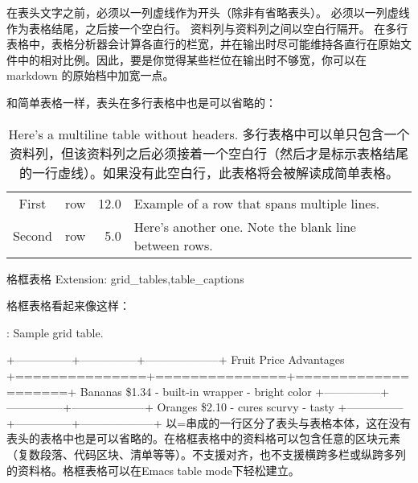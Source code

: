 \documentclass[fancyhdr,bookmark]{ctexbook}
\begin{document}
在表头文字之前，必须以一列虚线作为开头（除非有省略表头）。
必须以一列虚线作为表格结尾，之后接一个空白行。
资料列与资料列之间以空白行隔开。
在多行表格中，表格分析器会计算各直行的栏宽，并在输出时尽可能维持各直行在原始文件中的相对比例。因此，要是你觉得某些栏位在输出时不够宽，你可以在markdown
的原始档中加宽一点。

和简单表格一样，表头在多行表格中也是可以省略的：

\begin{longtable}[c]{@{}clrl@{}}
\caption{Here's a multiline table without headers.
多行表格中可以单只包含一个资料列，但该资料列之后必须接着一个空白行（然后才是标示表格结尾的一行虚线）。如果没有此空白行，此表格将会被解读成简单表格。}\tabularnewline
\toprule
\endfirsthead
\toprule
\begin{minipage}[t]{0.15\columnwidth}\centering\strut
First
\strut\end{minipage} &
\begin{minipage}[t]{0.10\columnwidth}\raggedright\strut
row
\strut\end{minipage} &
\begin{minipage}[t]{0.20\columnwidth}\raggedleft\strut
12.0
\strut\end{minipage} &
\begin{minipage}[t]{0.31\columnwidth}\raggedright\strut
Example of a row that spans multiple lines.
\strut\end{minipage}\tabularnewline
\begin{minipage}[t]{0.15\columnwidth}\centering\strut
Second
\strut\end{minipage} &
\begin{minipage}[t]{0.10\columnwidth}\raggedright\strut
row
\strut\end{minipage} &
\begin{minipage}[t]{0.20\columnwidth}\raggedleft\strut
5.0
\strut\end{minipage} &
\begin{minipage}[t]{0.31\columnwidth}\raggedright\strut
Here's another one. Note the blank line between rows.
\strut\end{minipage}\tabularnewline
\bottomrule
\end{longtable}

格框表格 Extension: grid\_tables,table\_captions

格框表格看起来像这样：

: Sample grid table.

+---------------+---------------+--------------------+ \textbar{} Fruit
\textbar{} Price \textbar{} Advantages \textbar{}
+===============+===============+====================+ \textbar{}
Bananas \textbar{} \$1.34 \textbar{} - built-in wrapper \textbar{}
\textbar{} \textbar{} \textbar{} - bright color \textbar{}
+---------------+---------------+--------------------+ \textbar{}
Oranges \textbar{} \$2.10 \textbar{} - cures scurvy \textbar{}
\textbar{} \textbar{} \textbar{} - tasty \textbar{}
+---------------+---------------+--------------------+
以=串成的一行区分了表头与表格本体，这在没有表头的表格中也是可以省略的。在格框表格中的资料格可以包含任意的区块元素（复数段落、代码区块、清单等等）。不支援对齐，也不支援横跨多栏或纵跨多列的资料格。格框表格可以在Emacs
table mode下轻松建立。
\end{document}
